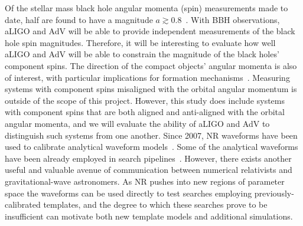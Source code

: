 Of the stellar mass black hole angular momenta (spin) measurements made to 
date, half are found to have a magnitude
$a\gtrsim0.8$~\cite{McClintock:2011zq}. With BBH observations, aLIGO and AdV 
will be able to provide independent measurements of the black hole spin 
magnitudes. Therefore, it will be interesting
to evaluate how well aLIGO and AdV will be able to constrain the magnitude of 
the black holes' component spins.
The direction of the compact objects' angular momenta is also
of interest, with particular implications for formation
mechanisms~\cite{Belczynski:2007xg}.  Measuring systems with component
spins misaligned with the orbital angular momentum is outside of the
scope of this project. However, this study does include systems with
component spins that are both aligned and anti-aligned with the
orbital angular momenta, and we will evaluate the ability of aLIGO and AdV to
distinguish such systems from one another.
% 
% 
Since
2007, NR waveforms have been used to calibrate analytical waveform
models~\cite{Buonanno:2007pf,Damour:2009kr,Pan:2011gk,Taracchini:2012ig,
Ajith:2009bn,Santamaria:2010yb,Damour:2012ky,Taracchini:2013rva}. Some
of the analytical waveforms have been already employed in search
pipelines~\cite{Aasi:2012rja}.  However, there exists another
useful and valuable avenue of communication between numerical
relativists and gravitational-wave astronomers.  As NR pushes into new
regions of parameter space the waveforms can be used directly to test
searches employing previously-calibrated templates, and the degree to
which these searches prove to be insufficient can motivate both new
template models and additional simulations.

